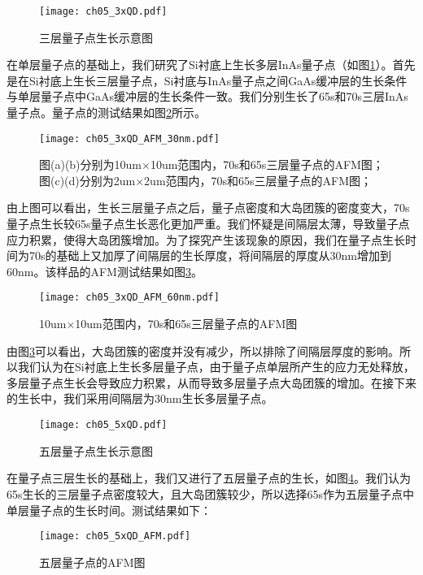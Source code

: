 \begin{figure}[ht]
	\centering
	\texttt{[image: ch05\_3xQD.pdf]}
	\caption{三层量子点生长示意图}
	\label{fig:3xQD}
\end{figure}

在单层量子点的基础上，我们研究了Si衬底上生长多层InAs量子点（如图\ref{fig:3xQD}）。首先是在Si衬底上生长三层量子点，Si衬底与InAs量子点之间GaAs缓冲层的生长条件与单层量子点中GaAs缓冲层的生长条件一致。我们分别生长了65s和70s三层InAs量子点。量子点的测试结果如图\ref{fig:3xQD_AFM_30nm}所示。

\begin{figure}[ht]
	\centering
	\texttt{[image: ch05\_3xQD\_AFM\_30nm.pdf]}
	\caption{图(a)(b)分别为10um×10um范围内，70s和65s三层量子点的AFM图；图(c)(d)分别为2um×2um范围内，70s和65s三层量子点的AFM图；}
	\label{fig:3xQD_AFM_30nm}
\end{figure}

由上图可以看出，生长三层量子点之后，量子点密度和大岛团簇的密度变大，70s量子点生长较65s量子点生长恶化更加严重。我们怀疑是间隔层太薄，导致量子点应力积累，使得大岛团簇增加。为了探究产生该现象的原因，我们在量子点生长时间为70s的基础上又加厚了间隔层的生长厚度，将间隔层的厚度从30nm增加到60nm。该样品的AFM测试结果如图\ref{fig:3xQD_AFM_60nm}。

\begin{figure}[ht]
	\centering
	\texttt{[image: ch05\_3xQD\_AFM\_60nm.pdf]}
	\caption{10um×10um范围内，70s和65s三层量子点的AFM图}
	\label{fig:3xQD_AFM_60nm}
\end{figure}

由图\ref{fig:3xQD_AFM_60nm}可以看出，大岛团簇的密度并没有减少，所以排除了间隔层厚度的影响。所以我们认为在Si衬底上生长多层量子点，由于量子点单层所产生的应力无处释放，多层量子点生长会导致应力积累，从而导致多层量子点大岛团簇的增加。在接下来的生长中，我们采用间隔层为30nm生长多层量子点。

\begin{figure}[ht]
	\centering
	\texttt{[image: ch05\_5xQD.pdf]}
	\caption{五层量子点生长示意图}
	\label{fig:5xQD}
\end{figure}

在量子点三层生长的基础上，我们又进行了五层量子点的生长，如图\ref{fig:5xQD}。我们认为65s生长的三层量子点密度较大，且大岛团簇较少，所以选择65s作为五层量子点中单层量子点的生长时间。测试结果如下：

\begin{figure}[ht]
	\centering
	\texttt{[image: ch05\_5xQD\_AFM.pdf]}
	\caption{五层量子点的AFM图}
	\label{fig:5xQD_AFM}
\end{figure}


